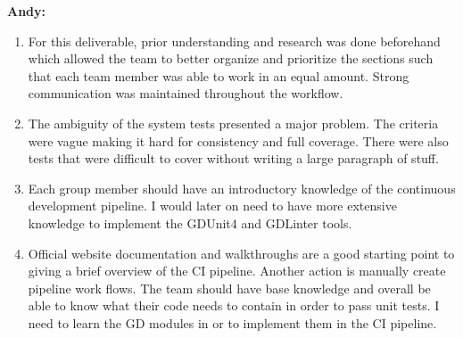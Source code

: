 \documentclass[12pt, titlepage]{article}
\begin{document}
\textbf{Andy:}
\begin{enumerate}
	\item For this deliverable, prior understanding and research was done beforehand which allowed the team to better organize and prioritize the sections such that each team member was able to work in an equal amount. Strong communication was maintained throughout the workflow. 
	\item The ambiguity of the system tests presented a major problem. The criteria were vague making it hard for consistency and full coverage. There were also tests that were difficult to cover without  writing a large paragraph of stuff.
	\item Each group member should have an introductory knowledge of the continuous development pipeline. I would later on need to have more extensive knowledge to implement the GDUnit4 and GDLinter tools.
	\item Official website documentation and walkthroughs are a good starting point to giving a brief overview of the CI pipeline. Another action is manually create pipeline work flows. The team should have base knowledge and overall be able to know what their code needs to contain in order to pass unit tests. I need to learn the GD modules in or to implement them in the CI pipeline.
\end{enumerate}
\end{document}
